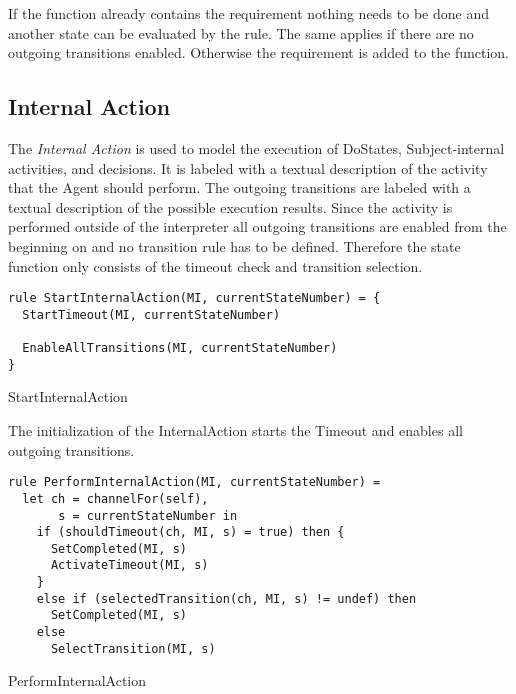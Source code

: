 If the  function already contains the
 requirement nothing needs to be done and another state can be evaluated by the  rule. The same applies if there are no outgoing transitions enabled. Otherwise the requirement is added to the  function.


\subsection{Internal Action}


The \emph{Internal Action} is used to model the execution of DoStates, Subject-internal activities, and decisions. It is labeled with a textual description of the activity that the Agent should perform. The outgoing transitions are labeled with a textual description of the possible execution results.
Since the activity is performed outside of the interpreter all outgoing transitions are enabled from the beginning on and no transition rule has to be defined. Therefore the state function only consists of the timeout check and transition selection.


\begin{listing}[htbp]
\begin{verbatim}
rule StartInternalAction(MI, currentStateNumber) = {
  StartTimeout(MI, currentStateNumber)

  EnableAllTransitions(MI, currentStateNumber)
}
\end{verbatim}
\caption{StartInternalAction}
\label{lst:shortasm:StartInternalAction}
\end{listing}


The initialization of the InternalAction starts the Timeout and enables all outgoing transitions.


\begin{listing}[htbp]
\begin{verbatim}
rule PerformInternalAction(MI, currentStateNumber) =
  let ch = channelFor(self),
       s = currentStateNumber in
    if (shouldTimeout(ch, MI, s) = true) then {
      SetCompleted(MI, s)
      ActivateTimeout(MI, s)
    }
    else if (selectedTransition(ch, MI, s) != undef) then
      SetCompleted(MI, s)
    else
      SelectTransition(MI, s)
\end{verbatim}
\caption{PerformInternalAction}
\label{lst:shortasm:PerformInternalAction}
\end{listing}


